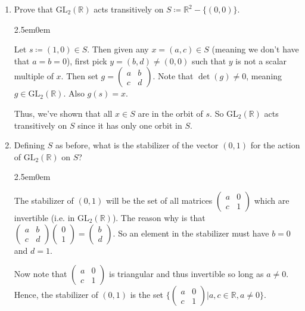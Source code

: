 \documentclass{book}
\newcommand{\exOne}{%
   \color{Purple}%
   \fontsize{13}{15}\selectfont%
}
\newenvironment{myIndent}{%
   \begin{adjustwidth}{2.5em}{0em}%
}{%
   \end{adjustwidth}%
}
\newcommand{\retTwo}{\hfill\bigbreak}
\begin{document}
\begin{enumerate}
	\item Prove that $\mathrm{GL}_2(\mathbb{R})$ acts transitively on $S \coloneq \mathbb{R}^2 - \{(0, 0)\}$.
	
	\begin{myIndent}\exOne
		Let $s \coloneq (1, 0) \in S$. Then given any $x = (a, c) \in S$ (meaning we don't have that $a = b = 0$), first pick $y = (b, d) \neq (0, 0)$ such that $y$ is not a scalar multiple of $x$. Then set $g = \left(
		\begin{smallmatrix}
			a & b \\ c & d
		\end{smallmatrix}\right)$. Note that $\det(g) \neq 0$, meaning $g \in \mathrm{GL}_2(\mathbb{R})$. Also $g(s) = x$.\retTwo

		Thus, we've shown that all $x \in S$ are in the orbit of $s$. So $\mathrm{GL}_2(\mathbb{R})$ acts\\ transitively on $S$ since it has only one orbit in $S$.\retTwo
	\end{myIndent}

	\item Defining $S$ as before, what is the stabilizer of the vector $(0, 1)$ for the action of $\mathrm{GL}_2(\mathbb{R})$ on $S$?
	
	\begin{myIndent}\exOne
		The stabilizer of $(0, 1)$ will be the set of all matrices $\left(
		\begin{smallmatrix}
			a & 0 \\ c & 1
		\end{smallmatrix}\right)$ which are invertible (i.e. in $\mathrm{GL}_2(\mathbb{R})$). The reason why is that $\left(
		\begin{smallmatrix}
			a & b \\ c & d
		\end{smallmatrix}\right)\left(
		\begin{smallmatrix}
			0 \\ 1
		\end{smallmatrix}\right) = \left(
			\begin{smallmatrix}
				b \\ d
			\end{smallmatrix}\right)$. So an element in the stabilizer must have $b = 0$ and $d = 1$.\retTwo

		Now note that $\left(
		\begin{smallmatrix}
			a & 0 \\ c & 1
		\end{smallmatrix}\right)$ is triangular and thus invertible so long as $a \neq 0$. Hence, the stabilizer of $(0, 1)$ is the set $\{\left(\begin{smallmatrix}
			a & 0 \\ c & 1
		\end{smallmatrix}\right) | a, c \in \mathbb{R}, a \neq 0 \}$.
		\retTwo
	\end{myIndent}


\end{enumerate}
\end{document}
